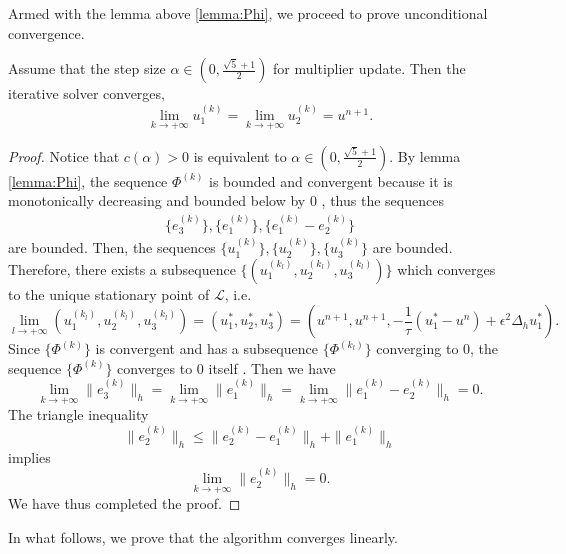 Armed with the lemma above \ref{lemma:Phi}, we proceed to prove unconditional convergence.
\begin{theorem}\label{thm:convergence}
    Assume that the step size $\alpha \in (0,\frac{\sqrt{5}+1}{2})$ for multiplier update. Then the iterative solver  converges,
    \begin{equation}
        \lim_{k\to +\infty} u_1^{(k)}=
        \lim_{k\to +\infty} u_2^{(k)}=u^{n+1}.
    \end{equation}
\end{theorem}
\begin{proof}
    Notice that $c(\alpha)>0$ is equivalent to $\alpha \in (0,\frac{\sqrt{5}+1}{2})$. By lemma \ref{lemma:Phi}, the sequence $\Phi^{(k)}$ is bounded and convergent because it is monotonically decreasing and bounded below by $0$ \cite{1976Principles}, thus the sequences
    \begin{align*}
        \{e_3^{(k)}\},\{e_1^{(k)}\},\{e_1^{(k)}-e_2^{(k)}\}
    \end{align*}
    are bounded. Then, the sequences
       $ \{u_1^{(k)}\},\{u_2^{(k)}\},\{u_3^{(k)}\}$ are bounded. Therefore, there exists a subsequence $\{(u_1^{(k_l)},u_2^{(k_l)},u_3^{(k_l)}) \}$ which converges to the unique stationary point of $\mathcal{L}$, i.e.
       \begin{equation}
           \lim_{l\to +\infty}(u_1^{(k_l)},u_2^{(k_l)},u_3^{(k_l)})=(u_1^*,u_2^*,u_3^*)=(u^{n+1},u^{n+1},-\frac{1}{\tau}(u_1^*-u^n)+\epsilon^2\Delta_hu_1^*).
       \end{equation}
      Since $\{\Phi^{(k)}\}$ is convergent and has a subsequence $\{\Phi^{(k_l)}\}$ converging to $0$, the sequence $\{\Phi^{(k)}\}$ converges to $0$ itself \cite{1976Principles}. Then we have
      \begin{equation}
          \lim_{k\to +\infty}\|e_3^{(k)}\|_h=\lim_{k\to +\infty}\|e_1^{(k)}\|_h=\lim_{k\to +\infty}\|e_1^{(k)}-e_2^{(k)}\|_h=0.
      \end{equation}
      The triangle inequality \begin{equation}
          \|e_2^{(k)}\|_h\leq \|e_2^{(k)}-e_1^{(k)}\|_h+\|e_1^{(k)}\|_h 
      \end{equation}
      implies 
      \begin{equation}
          \lim_{k\to +\infty}\|e_2^{(k)}\|_h=0. 
      \end{equation}
      We have thus completed the proof.
\end{proof}
In what follows, we prove that the algorithm converges linearly. 
